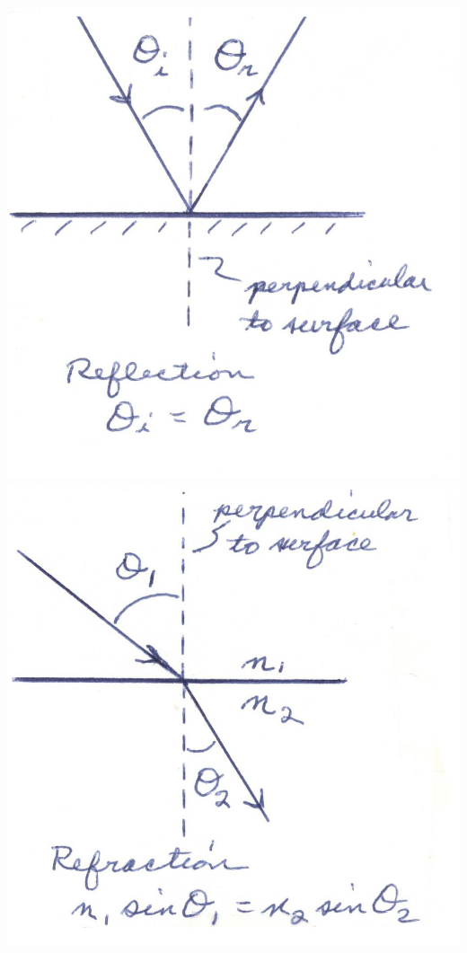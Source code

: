 \begin{multicols}{2}
\begin{center}
	{\includegraphics[scale=0.9]{5bgraf/fig_15}\label{f:fig15}}
	{\includegraphics[scale=0.9]{5bgraf/fig_16}\label{f:fig16}}
	\label{f:rfract}
	\label{f:fig14}
\end{center}




\end{multicols}

